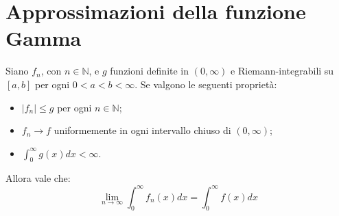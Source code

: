 \section{Approssimazioni della funzione Gamma}
\begin{lemma}\label{ga:LimiteIntegrali}
	Siano $f_n$, con $n\in\mathbb{N}$, e $g$ funzioni definite in $(0,\infty)$ e Riemann-integrabili su $[a,b]$ per ogni
	$0<a<b<\infty$. Se valgono le seguenti proprietà:
	\begin{itemize}
		\item $|f_n|\le g$ per ogni $n\in\mathbb{N}$;
		\item $f_n\to f$ uniformemente in ogni intervallo chiuso di $(0,\infty)$;
		\item $\int_0^\infty{g(x)dx}<\infty$.
	\end{itemize}
	Allora vale che:
	\begin{equation*}
		\lim_{n\to\infty}\int_0^\infty f_n(x)dx=\int_0^\infty f(x)dx
	\end{equation*}
\end{lemma}

